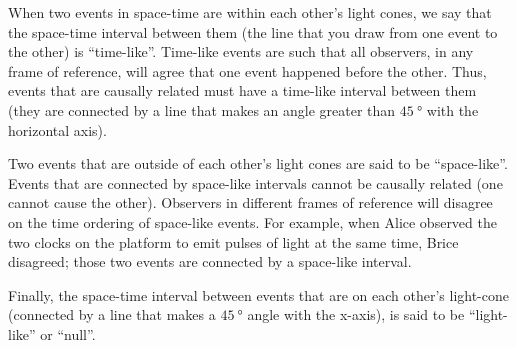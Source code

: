 When two events in space-time are within each other's light cones, we say that the space-time interval between them (the line that you draw from one event to the other) is ``time-like''. Time-like events are such that all observers, in any frame of reference, will agree that one event happened before the other. Thus, events that are causally related must have a time-like interval between them (they are connected by a line that makes an angle greater than $\SI{45}{\degree}$ with the horizontal axis).

Two events that are outside of each other's light cones are said to be ``space-like''. Events that are connected by space-like intervals cannot be causally related (one cannot cause the other). Observers in different frames of reference will disagree on the time ordering of space-like events. For example, when Alice observed the two clocks on the platform to emit pulses of light at the same time, Brice disagreed; those two events are connected by a space-like interval.

Finally, the space-time interval between events that are on each other's light-cone (connected by a line that makes a $\SI{45}{\degree}$ angle with the x-axis), is said to be ``light-like'' or ``null''. 

